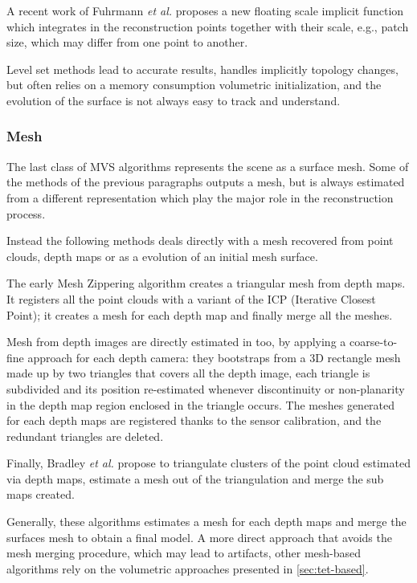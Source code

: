 A recent work of Fuhrmann \emph{et al.} proposes a new floating scale implicit function which integrates in the reconstruction  points together with their scale, e.g., patch size, which may differ from one point to another. 


Level set methods lead to accurate results, handles implicitly topology changes, but often relies on a memory consumption volumetric initialization, and the evolution of the surface is not always easy to track and understand.
\subsubsection{Mesh}

The last class of MVS algorithms represents the scene as a surface mesh. Some of the methods of the previous paragraphs outputs a mesh, but is always estimated from a different representation which play the major role in the reconstruction process.

Instead the following methods deals directly with a mesh recovered from point clouds, depth maps or as a evolution of an initial mesh surface.

The early Mesh Zippering algorithm \cite{turk1994zippered} creates a triangular mesh from depth maps. It registers all the point clouds with a variant of the ICP (Iterative Closest Point); it creates a mesh for each depth map and finally merge all the meshes.

Mesh from depth images are directly estimated in \cite{pollefeys_et_al_08} too, by applying a coarse-to-fine approach for each depth camera: they bootstraps from a 3D rectangle mesh made up by two triangles that covers all the depth image, each triangle is subdivided and its position re-estimated whenever discontinuity or non-planarity in the depth map region enclosed in the triangle occurs. The meshes generated for each depth maps are registered thanks to the sensor calibration, and the redundant triangles are deleted.

Finally, Bradley \emph{et al.} \cite{bradley2008accurate} propose to triangulate clusters of the point cloud estimated via depth maps, estimate a mesh out of the triangulation and merge the sub maps created.

Generally, these algorithms estimates a mesh for each depth maps and merge the surfaces mesh to obtain a final model.
A more direct approach that avoids the mesh merging procedure, which may lead to artifacts, other mesh-based algorithms rely on the volumetric approaches presented in \ref{sec:tet-based}.


